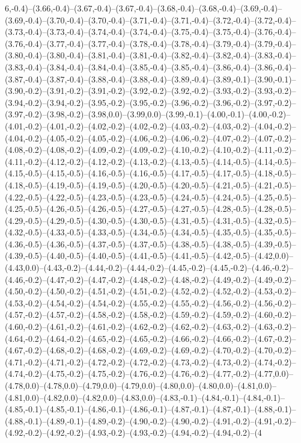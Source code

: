 6,-0.4)--(3.66,-0.4)--(3.67,-0.4)--(3.67,-0.4)--(3.68,-0.4)--(3.68,-0.4)--(3.69,-0.4)--(3.69,-0.4)--(3.70,-0.4)--(3.70,-0.4)--(3.71,-0.4)--(3.71,-0.4)--(3.72,-0.4)--(3.72,-0.4)--(3.73,-0.4)--(3.73,-0.4)--(3.74,-0.4)--(3.74,-0.4)--(3.75,-0.4)--(3.75,-0.4)--(3.76,-0.4)--(3.76,-0.4)--(3.77,-0.4)--(3.77,-0.4)--(3.78,-0.4)--(3.78,-0.4)--(3.79,-0.4)--(3.79,-0.4)--(3.80,-0.4)--(3.80,-0.4)--(3.81,-0.4)--(3.81,-0.4)--(3.82,-0.4)--(3.82,-0.4)--(3.83,-0.4)--(3.83,-0.4)--(3.84,-0.4)--(3.84,-0.4)--(3.85,-0.4)--(3.85,-0.4)--(3.86,-0.4)--(3.86,-0.4)--(3.87,-0.4)--(3.87,-0.4)--(3.88,-0.4)--(3.88,-0.4)--(3.89,-0.4)--(3.89,-0.1)--(3.90,-0.1)--(3.90,-0.2)--(3.91,-0.2)--(3.91,-0.2)--(3.92,-0.2)--(3.92,-0.2)--(3.93,-0.2)--(3.93,-0.2)--(3.94,-0.2)--(3.94,-0.2)--(3.95,-0.2)--(3.95,-0.2)--(3.96,-0.2)--(3.96,-0.2)--(3.97,-0.2)--(3.97,-0.2)--(3.98,-0.2)--(3.98,0.0)--(3.99,0.0)--(3.99,-0.1)--(4.00,-0.1)--(4.00,-0.2)--(4.01,-0.2)--(4.01,-0.2)--(4.02,-0.2)--(4.02,-0.2)--(4.03,-0.2)--(4.03,-0.2)--(4.04,-0.2)--(4.04,-0.2)--(4.05,-0.2)--(4.05,-0.2)--(4.06,-0.2)--(4.06,-0.2)--(4.07,-0.2)--(4.07,-0.2)--(4.08,-0.2)--(4.08,-0.2)--(4.09,-0.2)--(4.09,-0.2)--(4.10,-0.2)--(4.10,-0.2)--(4.11,-0.2)--(4.11,-0.2)--(4.12,-0.2)--(4.12,-0.2)--(4.13,-0.2)--(4.13,-0.5)--(4.14,-0.5)--(4.14,-0.5)--(4.15,-0.5)--(4.15,-0.5)--(4.16,-0.5)--(4.16,-0.5)--(4.17,-0.5)--(4.17,-0.5)--(4.18,-0.5)--(4.18,-0.5)--(4.19,-0.5)--(4.19,-0.5)--(4.20,-0.5)--(4.20,-0.5)--(4.21,-0.5)--(4.21,-0.5)--(4.22,-0.5)--(4.22,-0.5)--(4.23,-0.5)--(4.23,-0.5)--(4.24,-0.5)--(4.24,-0.5)--(4.25,-0.5)--(4.25,-0.5)--(4.26,-0.5)--(4.26,-0.5)--(4.27,-0.5)--(4.27,-0.5)--(4.28,-0.5)--(4.28,-0.5)--(4.29,-0.5)--(4.29,-0.5)--(4.30,-0.5)--(4.30,-0.5)--(4.31,-0.5)--(4.31,-0.5)--(4.32,-0.5)--(4.32,-0.5)--(4.33,-0.5)--(4.33,-0.5)--(4.34,-0.5)--(4.34,-0.5)--(4.35,-0.5)--(4.35,-0.5)--(4.36,-0.5)--(4.36,-0.5)--(4.37,-0.5)--(4.37,-0.5)--(4.38,-0.5)--(4.38,-0.5)--(4.39,-0.5)--(4.39,-0.5)--(4.40,-0.5)--(4.40,-0.5)--(4.41,-0.5)--(4.41,-0.5)--(4.42,-0.5)--(4.42,0.0)--(4.43,0.0)--(4.43,-0.2)--(4.44,-0.2)--(4.44,-0.2)--(4.45,-0.2)--(4.45,-0.2)--(4.46,-0.2)--(4.46,-0.2)--(4.47,-0.2)--(4.47,-0.2)--(4.48,-0.2)--(4.48,-0.2)--(4.49,-0.2)--(4.49,-0.2)--(4.50,-0.2)--(4.50,-0.2)--(4.51,-0.2)--(4.51,-0.2)--(4.52,-0.2)--(4.52,-0.2)--(4.53,-0.2)--(4.53,-0.2)--(4.54,-0.2)--(4.54,-0.2)--(4.55,-0.2)--(4.55,-0.2)--(4.56,-0.2)--(4.56,-0.2)--(4.57,-0.2)--(4.57,-0.2)--(4.58,-0.2)--(4.58,-0.2)--(4.59,-0.2)--(4.59,-0.2)--(4.60,-0.2)--(4.60,-0.2)--(4.61,-0.2)--(4.61,-0.2)--(4.62,-0.2)--(4.62,-0.2)--(4.63,-0.2)--(4.63,-0.2)--(4.64,-0.2)--(4.64,-0.2)--(4.65,-0.2)--(4.65,-0.2)--(4.66,-0.2)--(4.66,-0.2)--(4.67,-0.2)--(4.67,-0.2)--(4.68,-0.2)--(4.68,-0.2)--(4.69,-0.2)--(4.69,-0.2)--(4.70,-0.2)--(4.70,-0.2)--(4.71,-0.2)--(4.71,-0.2)--(4.72,-0.2)--(4.72,-0.2)--(4.73,-0.2)--(4.73,-0.2)--(4.74,-0.2)--(4.74,-0.2)--(4.75,-0.2)--(4.75,-0.2)--(4.76,-0.2)--(4.76,-0.2)--(4.77,-0.2)--(4.77,0.0)--(4.78,0.0)--(4.78,0.0)--(4.79,0.0)--(4.79,0.0)--(4.80,0.0)--(4.80,0.0)--(4.81,0.0)--(4.81,0.0)--(4.82,0.0)--(4.82,0.0)--(4.83,0.0)--(4.83,-0.1)--(4.84,-0.1)--(4.84,-0.1)--(4.85,-0.1)--(4.85,-0.1)--(4.86,-0.1)--(4.86,-0.1)--(4.87,-0.1)--(4.87,-0.1)--(4.88,-0.1)--(4.88,-0.1)--(4.89,-0.1)--(4.89,-0.2)--(4.90,-0.2)--(4.90,-0.2)--(4.91,-0.2)--(4.91,-0.2)--(4.92,-0.2)--(4.92,-0.2)--(4.93,-0.2)--(4.93,-0.2)--(4.94,-0.2)--(4.94,-0.2)--(4